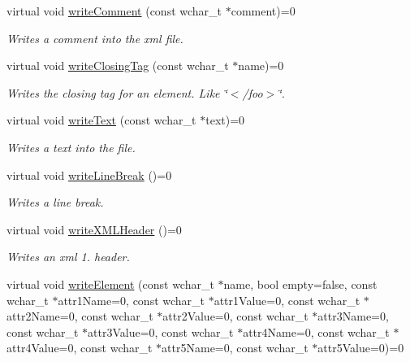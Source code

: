 \begin{DoxyCompactItemize}
virtual void \hyperlink{classirr_1_1io_1_1IXMLWriter_af6de322540d69764bd33a384763babd1}{write\+Comment} (const wchar\+\_\+t $\ast$comment)=0
\begin{DoxyCompactList}\small\item\em Writes a comment into the xml file. \end{DoxyCompactList}\item 
\mbox{\label{classirr_1_1io_1_1IXMLWriter_a904c931fe03455eee04fcf41ef519715}} 
virtual void \hyperlink{classirr_1_1io_1_1IXMLWriter_a904c931fe03455eee04fcf41ef519715}{write\+Closing\+Tag} (const wchar\+\_\+t $\ast$name)=0
\begin{DoxyCompactList}\small\item\em Writes the closing tag for an element. Like \char`\"{}$<$/foo$>$\char`\"{}. \end{DoxyCompactList}\item 
virtual void \hyperlink{classirr_1_1io_1_1IXMLWriter_a321adae57bcf06aadd2dda57eba1e4a6}{write\+Text} (const wchar\+\_\+t $\ast$text)=0
\begin{DoxyCompactList}\small\item\em Writes a text into the file. \end{DoxyCompactList}\item 
\mbox{\label{classirr_1_1io_1_1IXMLWriter_a98d9b558d991211f77f6d3f2f68d30d2}} 
virtual void \hyperlink{classirr_1_1io_1_1IXMLWriter_a98d9b558d991211f77f6d3f2f68d30d2}{write\+Line\+Break} ()=0
\begin{DoxyCompactList}\small\item\em Writes a line break. \end{DoxyCompactList}\item 
virtual void \hyperlink{classirr_1_1io_1_1IXMLWriter_a66fd00f6528fc967e53ea2a83f4fbf09}{write\+X\+M\+L\+Header} ()=0
\begin{DoxyCompactList}\small\item\em Writes an xml 1. header. \end{DoxyCompactList}\item 
virtual void \hyperlink{classirr_1_1io_1_1IXMLWriter_a09ffde58db20f23b7eba1bf08e1daf42}{write\+Element} (const wchar\+\_\+t $\ast$name, bool empty=false, const wchar\+\_\+t $\ast$attr1\+Name=0, const wchar\+\_\+t $\ast$attr1\+Value=0, const wchar\+\_\+t $\ast$attr2\+Name=0, const wchar\+\_\+t $\ast$attr2\+Value=0, const wchar\+\_\+t $\ast$attr3\+Name=0, const wchar\+\_\+t $\ast$attr3\+Value=0, const wchar\+\_\+t $\ast$attr4\+Name=0, const wchar\+\_\+t $\ast$attr4\+Value=0, const wchar\+\_\+t $\ast$attr5\+Name=0, const wchar\+\_\+t $\ast$attr5\+Value=0)=0

\end{DoxyCompactItemize}
